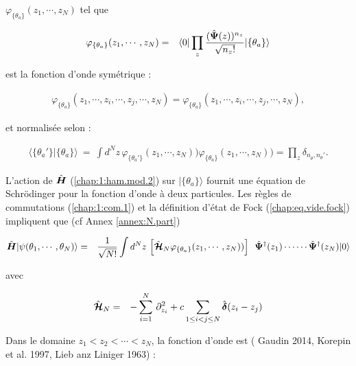  \(\varphi_{\{\theta_a\}}(z_1, \cdots ,  z_N)\) tel que 

\begin{eqnarray}
	\varphi_{\{\theta_a\}}(z_1, \cdots ,  z_N) & = & 	\langle 0 \vert  \prod_z\frac{(\hat{\bm{\Psi}}(z))^{n_z}}{\sqrt{n_z !}}\vert  \{\theta_a\}  \rangle 
\end{eqnarray}


est la fonction d’onde symétrique :

\begin{eqnarray}
	\varphi_{\{\theta_a\}}(z_1, \cdots ,z_i , \cdots , z_j,  \cdots ,  z_N) = \varphi_{\{\theta_a\}}(z_1, \cdots ,z_i , \cdots , z_j,  \cdots ,  z_N),
\end{eqnarray}

et normalisée selon :

\begin{eqnarray}
	\langle \{\theta_a'\} \vert \{\theta_a^{}\} \rangle ~=~ \int d^Nz\,\varphi_{\{\theta_a'\}}(z_1, \cdots ,  z_N))  \varphi_{\{\theta_a^{}\}}(z_1, \cdots ,  z_N)) = \prod_z\delta_{n_\theta^{},n_\theta'}.
\end{eqnarray}

L’action de \(\hat{\bm{H}}\) (\ref{chap:1:ham.mod.2}) sur \(\vert \{\theta_a\} \rangle\) fournit une équation de Schrödinger pour la fonction d’onde à deux particules. Les règles de commutations (\ref{chap:1:com.1}) et la définition d'état de Fock (\ref{chap:eq.vide.fock}) impliquent que (cf Annex \ref{annex:N.part})

%



\begin{eqnarray}
	\operator{H}\vert \psi ( \theta_1 , \cdots , \theta_N ) \rangle &= &  \frac{1}{ \sqrt{N!}} \int d^N z \,  	\left [ \operator{\mathcal{H}}_N \varphi_{\{\theta_a\}}(z_1, \cdots ,  z_N)) \right ] \, \operator{\Psi}^\dag(z_1) \cdots  \cdots\operator{\Psi}^\dag(z_N) \vert 0 \rangle		
\end{eqnarray}

avec 

\begin{eqnarray}
	\hat{\bm{\mathcal{H}}}_N & = &  - \sum_{i=1}^N \, \partial_{z_i}^2 + 	c \sum_{1\leq i<j\leq N} \hat{\bm{\delta}}(z_i - z_j) 		
\end{eqnarray}


Dans le domaine $z_1 < z_2 < \cdots < z_N$, la fonction d'onde est ({\color{blue} Gaudin 2014}, {\color{blue}Korepin et al. 1997}, {\color{blue}Lieb anz Liniger 1963}) :

